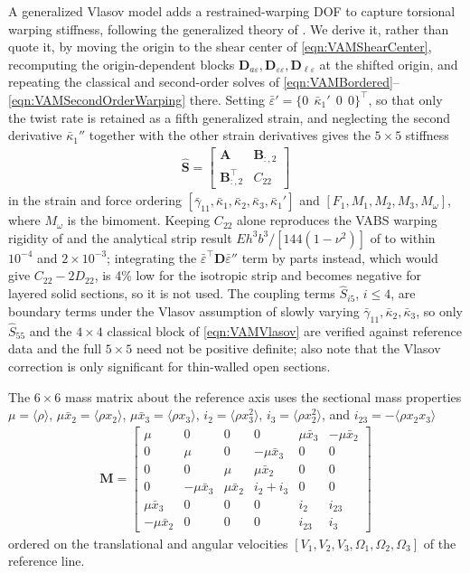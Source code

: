 \documentclass[10pt]{article}
\newcommand{\mbf}[1]{\mathbf{#1}}
\newcommand{\beq}{\begin{equation}\begin{aligned}}
\newcommand{\eeq}{\end{aligned}\end{equation}}
\begin{document}
A generalized Vlasov model adds a restrained-warping \ac{DOF} to capture torsional warping stiffness, following the generalized theory of \citet{Yu2005b}.
We derive it, rather than quote it, by moving the origin to the shear center of \autoref{eqn:VAMShearCenter}, recomputing the origin-dependent blocks $\mbf{D}_{a\varepsilon}, \mbf{D}_{\varepsilon\varepsilon}, \mbf{D}_{\ell\varepsilon}$ at the shifted origin, and repeating the classical and second-order solves of \autoref{eqn:VAMBordered}--\autoref{eqn:VAMSecondOrderWarping} there.
Setting $\bar\varepsilon' = \{0\ \ \bar\kappa_1'\ \ 0\ \ 0\}^\top$, so that only the twist rate is retained as a fifth generalized strain, and neglecting the second derivative $\bar\kappa_1''$ together with the other strain derivatives gives the $5\times5$ stiffness
\beq
\hat{\mbf{S}} =
\begin{bmatrix}
\mbf{A} & \mbf{B}_{:,2} \\
\mbf{B}_{:,2}^\top & C_{22}
\end{bmatrix}
\label{eqn:VAMVlasov}
\eeq
in the strain and force ordering $[\bar\gamma_{11},\bar\kappa_1,\bar\kappa_2,\bar\kappa_3,\bar\kappa_1']$ and $[F_1,M_1,M_2,M_3,M_\omega]$, where $M_\omega$ is the bimoment.
Keeping $C_{22}$ alone reproduces the \ac{VABS} warping rigidity of \citet[Table~7.9]{Hodges2006} and the analytical strip result $E h^3 b^3 / [144 (1-\nu^2)]$ of \citet[Eq.~(7.81)]{Hodges2006} to within $10^{-4}$ and $2\times10^{-3}$; integrating the $\bar\varepsilon^\top \mbf{D} \bar\varepsilon''$ term by parts instead, which would give $C_{22} - 2D_{22}$, is 4\% low for the isotropic strip and becomes negative for layered solid sections, so it is not used.
The coupling terms $\hat S_{i5}$, $i \le 4$, are boundary terms under the Vlasov assumption of slowly varying $\bar\gamma_{11}, \bar\kappa_2, \bar\kappa_3$, so only $\hat S_{55}$ and the $4\times4$ classical block of \autoref{eqn:VAMVlasov} are verified against reference data and the full $5\times5$ need not be positive definite; \citet{Yu2005b} also note that the Vlasov correction is only significant for thin-walled open sections.

The $6\times6$ mass matrix about the reference axis uses the sectional mass properties $\mu = \langle\rho\rangle$, $\mu\bar x_2 = \langle\rho x_2\rangle$, $\mu\bar x_3 = \langle\rho x_3\rangle$, $i_2 = \langle\rho x_3^2\rangle$, $i_3 = \langle\rho x_2^2\rangle$, and $i_{23} = -\langle\rho x_2 x_3\rangle$ \citep[Eqs.~(5.23), (5.104)]{Hodges2006}
\beq
\mbf{M} =
\begin{bmatrix}
\mu & 0 & 0 & 0 & \mu\bar x_3 & -\mu\bar x_2 \\
0 & \mu & 0 & -\mu\bar x_3 & 0 & 0 \\
0 & 0 & \mu & \mu\bar x_2 & 0 & 0 \\
0 & -\mu\bar x_3 & \mu\bar x_2 & i_2+i_3 & 0 & 0 \\
\mu\bar x_3 & 0 & 0 & 0 & i_2 & i_{23} \\
-\mu\bar x_2 & 0 & 0 & 0 & i_{23} & i_3
\end{bmatrix}
\label{eqn:VAMMass}
\eeq
ordered on the translational and angular velocities $[V_1,V_2,V_3,\Omega_1,\Omega_2,\Omega_3]$ of the reference line.
\end{document}
